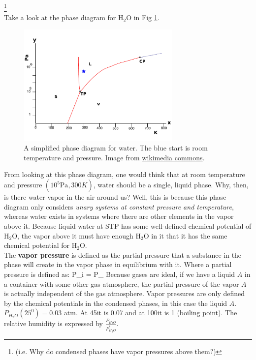 \documentclass[12pt]{article}
\begin{document}
\footnote{(i.e. Why do condensed phases have vapor pressures above them?)}\\
Take a look at the phase diagram for $\text{H}_2\text{O}$ in Fig \ref{PDH2O}.
\begin{figure}[h]
\centering
\includegraphics[width=8cm]{Water_phase_diagram}
\caption{A simplified phase diagram for water. The blue start is room temperature and pressure. Image from \href{https://commons.wikimedia.org/wiki/File:Water_phase_diagram.svg}{wikimedia commons}.}
\label{PDH2O}
\end{figure}
From looking at this phase diagram, one would think that at room temperature and pressure $\left(10^5\text{Pa}, 300 K\right)$, water should be
a single, liquid phase. Why, then, is there water vapor in the air around us? Well, this is because this phase diagram only considers \textit{unary
systems at constant pressure and temperature}, whereas water exists in systems where there are other elements in the vapor above it. Because liquid water at STP has some well-defined chemical potential of $\text{H}_2\text{O}$, the vapor above it must have enough $\text{H}_2\text{O}$ in it that it has the same chemical potential for $\text{H}_2\text{O}$.\\

The \textbf{vapor pressure} is defined as the partial pressure that a substance in the  phase will create in the vapor phase in equilibrium with it. Where a partial pressure is defined as:
\eqs
P_i =  P_
\eqe
Because gases are ideal, if we have a liquid $A$ in a container with some other gas atmosphere, the partial pressure of the vapor $A$ is actually independent of the gas atmosphere. Vapor pressures are only defined by the chemical potentials in the condensed phases, in this case the liquid $A$.\\

 $P_{H_2O}(25^0) = 0.03$ atm.  At 45\degree it is 0.07 and at 100\degree it is 1 (boiling point).  The relative humidity is expressed by $\frac{P_{H_2O}}{P_{H_2O}^*}$.
\end{document}

